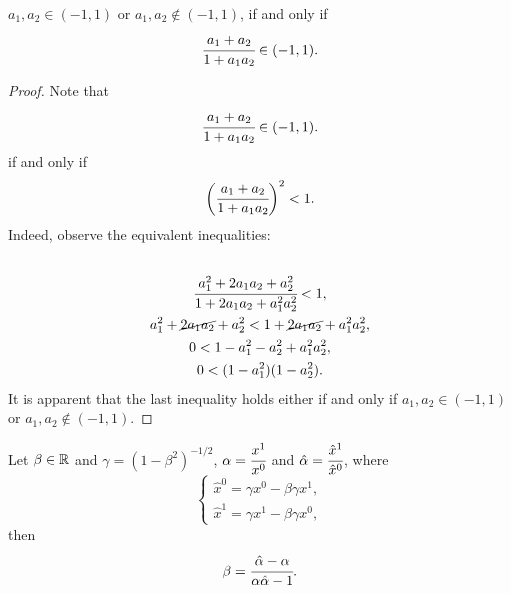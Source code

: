 \documentclass[main.tex]{subfiles}
\begin{document}
\begin{lemma}
\label{all_to_subluminal}
$a_1, a_2 \in (-1, 1)$ or $a_1, a_2 \not\in (-1, 1)$, if and only if
\begin{equation}
\cfrac{a_1 + a_2}{1 + a_1 a_2} \in (-1, 1).
\end{equation}
\end{lemma}

\begin{proof}
Note that 
\begin{equation}
\cfrac{a_1 + a_2}{1 + a_1 a_2} \in (-1, 1).
\end{equation}
if and only if
\begin{equation}
\bigg(\cfrac{a_1 + a_2}{1 + a_1 a_2}\bigg)^2 < 1.
\end{equation}
Indeed, observe the equivalent inequalities:
\begin{multline*}
\\
\cfrac{a_1^2 + 2a_1 a_2 + a_2^2}{1 + 2a_1 a_2 + a_1^2 a_2^2} < 1,\\
a_1^2 + \cancel{2a_1 a_2} + a_2^2 < 1 + \cancel{2a_1 a_2} + a_1^2 a_2^2,\\
0 < 1 - a_1^2 - a_2^2 + a_1^2 a_2^2,\\
0 < (1 - a_1^2)(1 - a_2^2).
\\
\end{multline*}
It is apparent that the last inequality holds either if and only if $a_1, a_2 \in (-1, 1)$ or $a_1, a_2 \not\in (-1, 1)$.
\end{proof}

\begin{lemma}
Let $\beta\in \mathbb{R}$ and $\gamma = (1 - \beta^2)^{-1/2}$, $\alpha = \cfrac{x^1}{x^0}$ and $\hat{\alpha} = \cfrac{\hat{x}^1}{\hat{x}^0}$, where
\begin{equation}
\begin{cases}
    \hat{x}^0 = \gamma x^0 - \beta \gamma x^1, \\
    \hat{x}^1 = \gamma x^1 -\beta \gamma x^0,
\end{cases}
\end{equation} 
then
\begin{equation}
\beta = \cfrac{\hat{\alpha} - \alpha}{\alpha \hat{\alpha} - 1}.
\end{equation}
\end{lemma}
\end{document}
